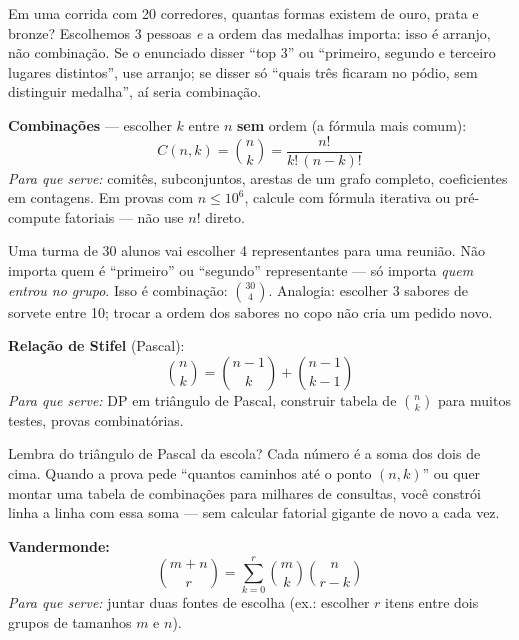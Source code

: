 \begin{exemplodiabox}
Em uma corrida com 20 corredores, quantas formas existem de ouro, prata e bronze? Escolhemos 3 pessoas \emph{e} a ordem das medalhas importa: isso é arranjo, não combinação. Se o enunciado disser ``top 3'' ou ``primeiro, segundo e terceiro lugares distintos'', use arranjo; se disser só ``quais três ficaram no pódio, sem distinguir medalha'', aí seria combinação.
\end{exemplodiabox}


\textbf{Combinações} --- escolher $k$ entre $n$ \textbf{sem} ordem (a fórmula mais comum):
\begin{equation}
  C(n,k) = \binom{n}{k} = \frac{n!}{k!\,(n-k)!}
\end{equation}
\emph{Para que serve:} comitês, subconjuntos, arestas de um grafo completo, coeficientes em contagens.
Em provas com $n \le 10^6$, calcule com fórmula iterativa ou pré-compute fatoriais --- não use $n!$ direto.

\begin{exemplodiabox}
Uma turma de 30 alunos vai escolher 4 representantes para uma reunião. Não importa quem é ``primeiro'' ou ``segundo'' representante --- só importa \emph{quem entrou no grupo}. Isso é combinação: $\binom{30}{4}$. Analogia: escolher 3 sabores de sorvete entre 10; trocar a ordem dos sabores no copo não cria um pedido novo.
\end{exemplodiabox}


\textbf{Relação de Stifel} (Pascal):
\begin{equation}
  \binom{n}{k} = \binom{n-1}{k} + \binom{n-1}{k-1}
\end{equation}
\emph{Para que serve:} DP em triângulo de Pascal, construir tabela de $\binom{n}{k}$ para muitos testes, provas combinatórias.

\begin{exemplodiabox}
Lembra do triângulo de Pascal da escola? Cada número é a soma dos dois de cima. Quando a prova pede ``quantos caminhos até o ponto $(n,k)$'' ou quer montar uma tabela de combinações para milhares de consultas, você constrói linha a linha com essa soma --- sem calcular fatorial gigante de novo a cada vez.
\end{exemplodiabox}


\textbf{Vandermonde:}
\begin{equation}
  \binom{m+n}{r} = \sum_{k=0}^{r} \binom{m}{k}\binom{n}{r-k}
\end{equation}
\emph{Para que serve:} juntar duas fontes de escolha (ex.: escolher $r$ itens entre dois grupos de tamanhos $m$ e $n$).

